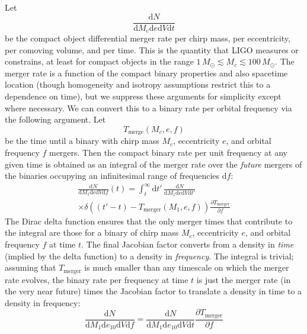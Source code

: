 \documentclass[twocolumn]{aastex631}
\newcommand{\dd}{\mathrm{d}}
\newcommand{\diff}[2]{\frac{\dd #1}{\dd #2}}
\newcommand{\MSun}{M_\odot}
\begin{document}
{Let 
\begin{equation}
    \diff{N}{M_c \dd e \dd V \dd t} 
\end{equation}
be the compact object differential merger rate per chirp mass, per eccentricity,
per comoving volume, and per time.  This is the quantity that LIGO measures or
constrains, at least for compact objects in the range $1 \, \MSun \lesssim M_c
\lesssim 100 \, \MSun$.  The merger rate is a function of the compact binary
properties and also spacetime location (though homogeneity and isotropy
assumptions restrict this to a dependence on time), but we suppress these
arguments for simplicity except where necessary.  We can convert this to a
binary rate per orbital frequency via the following argument.  Let 
\begin{equation}
    T_\mathrm{merge}\left( M_c, e, f \right)
\end{equation}
be the time until a binary with chirp mass $M_c$, eccentricity $e$,
and orbital frequency $f$ mergers.  Then the compact binary rate per unit frequency at any given time is
obtained as an integral of the merger rate over the \emph{future} mergers of the
binaries occupying an infinitesimal range of frequencies $\dd f$:
\begin{multline}
    \diff{N}{M_1 \dd e \dd V \dd f}\left( t \right) = \int_{t}^{\infty} \dd t' \, \diff{N}{M_1 \dd e \dd V \dd t'} \\ \times \delta\left( \left( t' - t \right) - T_\mathrm{merger}\left( M_1, e, f \right) \right) \frac{\partial T_\mathrm{merger}}{\partial f}
\end{multline}
The Dirac delta function ensures that the only merger times that contribute to
the integral are those for a binary of chirp mass $M_c$, eccentricity $e$, and
orbital frequency $f$ at time $t$.  The final Jacobian factor converts from a
density in \emph{time} (implied by the delta function) to a density in
\emph{frequency}.  The integral is trivial; assuming that $T_\mathrm{merger}$ is
much smaller than any timescale on which the merger rate evolves, the binary
rate per frequency at time $t$ is just the merger rate (in the very near future)
times the Jacobian factor to translate a density in time to a density in
frequency:
\begin{equation}
    \label{eq:mergers-per-frequency}
    \diff{N}{M_1 \dd e_{10} \dd V \dd f} = \diff{N}{M_1 \dd e_{10} \dd V \dd t} \frac{\partial T_\mathrm{merger}}{\partial f}
\end{equation}

}
\end{document}

